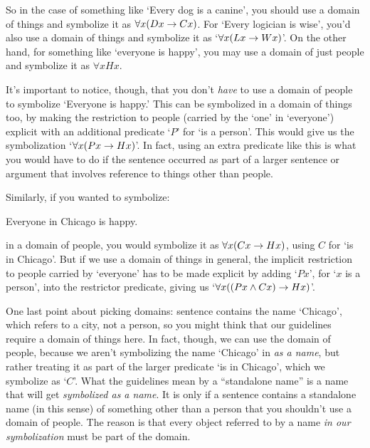 So in the case of something like `Every dog is a canine', you should use a domain of things and symbolize it as $\forall x(Dx \rightarrow Cx)$.  For `Every logician is wise', you'd also use a domain of things and symbolize it as `$\forall x(Lx \rightarrow Wx)$'. On the other hand, for something like `everyone is happy', you may use a domain of just people and symbolize it as $\forall xHx$.

It's important to notice, though, that you don't \emph{have} to use a domain of people to symbolize `Everyone is happy.' This can be symbolized in a domain of things too, by making the restriction to people (carried by the `one' in `everyone') explicit with an additional predicate `$P$' for `\blank is a person'. This would give us the symbolization `$\forall x(Px \rightarrow Hx)$'.  In fact, using an extra predicate like this is what you would have to do if the sentence occurred as part of a larger sentence or argument that involves reference to things other than people.   

Similarly, if you wanted to symbolize:
\begin{earg}
	\item[\ex{quan5}] Everyone in Chicago is happy.
\end{earg}
in a domain of people, you would symbolize it as $\forall x(Cx \rightarrow Hx)$, using $C$ for `\blank is in Chicago'.  But if we use a domain of things in general, the implicit restriction to people carried by `everyone' has to be made explicit by adding `$Px$', for `$x$ is a person', into the restrictor predicate, giving us  `$\forall x((Px \wedge Cx) \rightarrow Hx)$'.

One last point about picking domains: sentence  contains the name `Chicago', which refers to a city, not a person, so you might think that our guidelines require a domain of things here.  In fact, though, we can use the domain of people, because we aren't symbolizing the name `Chicago' in  \emph{as a name}, but rather treating it as part of the larger predicate `\blank is in Chicago', which we symbolize as `$C$'.  What the guidelines mean by a ``standalone name'' is a name that will get \emph{symbolized as a name}.  It is only if a sentence contains a standalone name (in this sense) of something other than a person that you shouldn't use a domain of people.  The reason is that every object referred to by a name \emph{in our symbolization} must be part of the domain.


